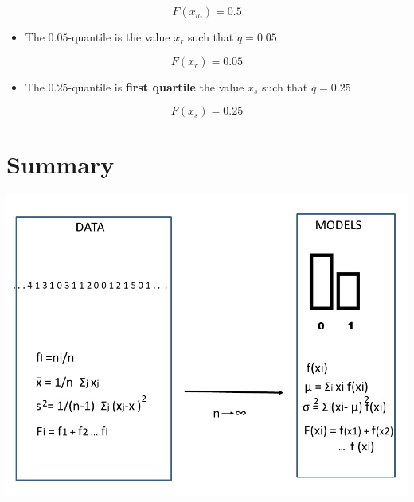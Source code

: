 \documentclass[
]{book}
\providecommand{\tightlist}{%
  \setlength{\itemsep}{0pt}\setlength{\parskip}{0pt}}
\begin{document}
\[F(x_{m})=0.5\]

\begin{itemize}
\tightlist
\item
  The \(0.05\)-quantile is the value \(x_{r}\) such that \(q=0.05\)
\end{itemize}

\[F(x_{r})=0.05\]

\begin{itemize}
\tightlist
\item
  The \(0.25\)-quantile is \textbf{first quartile} the value \(x_{s}\) such that \(q=0.25\)
\end{itemize}

\[F(x_{s})=0.25\]

\hypertarget{summary}{%
\section{Summary}\label{summary}}

\includegraphics{./figures/randomvarsum.JPG}
\end{document}
